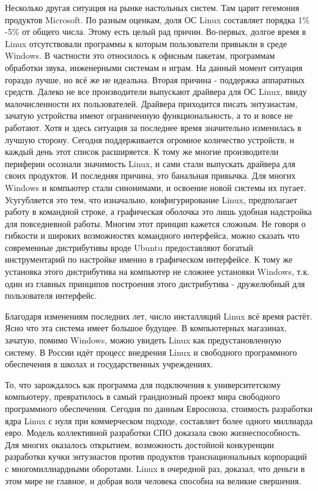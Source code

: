 \documentclass[bachelor, och, referat, times]{SCWorks}
\begin{document}
\par Несколько другая ситуация на рынке настольных 
систем. Там царит 
гегемония продуктов Microsoft. По разным оценкам, 
доля ОС Linux составляет
порядка 1\% -5\% от общего числа. Этому есть целый 
рад причин. Во-первых, 
долгое время в Linux отсутствовали программы к 
которым пользователи 
привыкли в среде Windows. В частности это 
относилось к офисным пакетам, 
программам обработки звука, инженерными системам и 
играм. На данный момент
ситуация гораздо лучше, но всё же не идеальна. 
Вторая причина - поддержка 
аппаратных средств. Далеко не все производители 
выпускают драйвера для ОС 
Linux, ввиду малочисленности их пользователей. 
Драйвера приходится писать 
энтузиастам, зачатую устройства имеют ограниченную 
функциональность, а то 
и вовсе не работают. Хотя и здесь ситуация за 
последнее время значительно 
изменилась в лучшую сторону. Сегодня поддерживается 
огромное количество 
устройств, и каждый день этот список расширяется. К 
тому же многие 
производители периферии осознали значимость Linux, 
и сами стали выпускать 
драйвера для своих продуктов. И последняя причина, 
это банальная привычка.
Для многих Windows и компьютер стали синонимами, и 
освоение новой системы 
их пугает. Усугубляется это тем, что изначально, 
конфигурирование Linux, 
предполагает работу в командной строке, а 
графическая оболочка это лишь 
удобная надстройка для повседневной работы. Многим 
этот принцип кажется 
сложным. Не говоря о гибкости и широких 
возможностях командного 
интерфейса, можно сказать что современные 
дистрибутивы вроде Ubuntu 
предоставляют богатый инструментарий по настройке 
именно в графическом 
интерфейсе. К тому же установка этого дистрибутива 
на компьютер не сложнее
установки Windows, т.к. один из главных принципов 
построения этого 
дистрибутива - дружелюбный для пользователя 
интерфейс.

\par Благодаря изменениям последних лет, число 
инсталляций Linux всё время
растёт. Ясно что эта система имеет большое будущее. 
В компьютерных 
магазинах, зачатую, помимо Windows, можно увидеть 
Linux как 
предустановленную систему. В России идёт процесс 
внедрения Linux и 
свободного программного обеспечения в школах и 
государственных 
учреждениях.

\conclusion

То, что зарождалось как программа для подключения к 
университетскому 
компьютеру, превратилось в самый грандиозный проект 
мира свободного 
программного обеспечения. Сегодня по данным 
Евросоюза, стоимость 
разработки ядра Linux с нуля при коммерческом 
подходе, составляет более 
одного миллиарда евро. Модель коллективной 
разработки СПО доказала свою 
жизнеспособность. Для многих оказалось открытием, 
возможность достойной 
конкуренции разработки кучки энтузиастов против 
продуктов 
транснациональных корпораций с многомиллиардными 
оборотами. Linux в 
очередной раз, доказал, что деньги в этом мире не 
главное, и добрая воля 
человека способна на великие свершения.
\end{document}

